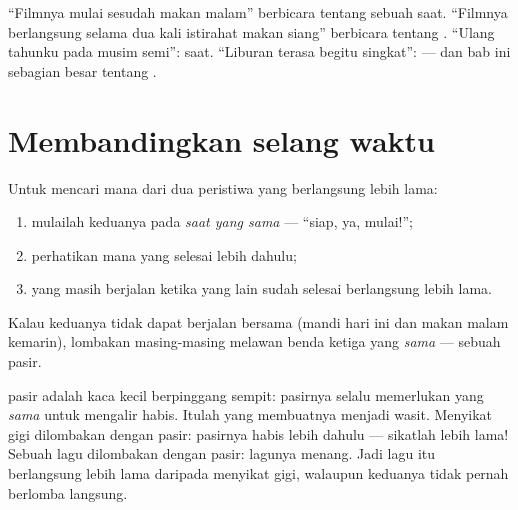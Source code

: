 \begin{example}\label{ex:g2:measuring-time:whenhowlong}
``Filmnya mulai sesudah makan malam'' berbicara tentang sebuah saat.
``Filmnya berlangsung selama dua kali istirahat makan siang''
berbicara tentang . ``Ulang tahunku pada musim semi'':
saat. ``Liburan terasa begitu singkat'':  --- dan bab ini
sebagian besar tentang .
\end{example}

\section{Membandingkan selang waktu}

\begin{method}\label{met:g2:measuring-time:race}
Untuk mencari mana dari dua peristiwa yang berlangsung lebih lama:
\begin{enumerate}
  \item mulailah keduanya pada \emph{saat yang sama} --- ``siap, ya,
        mulai!'';
  \item perhatikan mana yang selesai lebih dahulu;
  \item yang masih berjalan ketika yang lain sudah selesai berlangsung
        lebih lama.
\end{enumerate}
Kalau keduanya tidak dapat berjalan bersama (mandi hari ini dan makan
malam kemarin), lombakan masing-masing melawan benda ketiga yang
\emph{sama} --- sebuah  pasir.
\end{method}

\begin{example}\label{ex:g2:measuring-time:sandtimer}
 pasir adalah kaca kecil berpinggang sempit: pasirnya selalu
memerlukan  yang \emph{sama} untuk mengalir habis. Itulah
yang membuatnya menjadi wasit. Menyikat gigi dilombakan dengan 
pasir: pasirnya habis lebih dahulu --- sikatlah lebih lama! Sebuah
lagu dilombakan dengan  pasir: lagunya menang. Jadi lagu itu
berlangsung lebih lama daripada menyikat gigi, walaupun keduanya
tidak pernah berlomba langsung.
\end{example}

